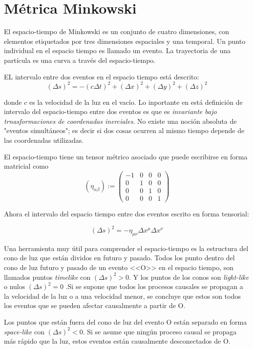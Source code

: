 
	\section{Métrica Minkowski}
	
	El espacio-tiempo de Minkowski es un conjunto de cuatro dimensiones, con elementos etiquetados por tres dimensiones espaciales y una temporal. Un punto individual en el espacio tiempo es llamado un evento. La trayectoria de una partícula es una curva a través del espacio-tiempo. 
	
	
	
	EL intervalo entre dos eventos en el espacio tiempo está descrito:
	$$(\Delta s)^2=-(c\Delta t)^2+(\Delta x)^{2}+(\Delta y)^{2}+(\Delta z)^{2}$$
	
	
	
	
	donde $c$ es la velocidad de la luz en el vacío. Lo inportante en está definición de intervalo del espacio-tiempo entre dos eventos es que es \textit{invariante bajo trnasformaciones de coordenadas inerciales}. No existe una noción absoluta de "eventos simultáneos"; es decir si dos cosas ocurren al mismo tiempo depende de las coordenadas utilizadas.

	El espacio-tiempo tiene un tensor métrico asociado que puede escribirse en forma matricial como
$${\displaystyle \left(\eta _{\alpha \beta }\right):={\begin{pmatrix}-1&0&0&0\\0&1&0&0\\0&0&1&0\\0&0&0&1\end{pmatrix}}} $$
	
Ahora el intervalo del espacio tiempo entre dos eventos escrito en forma tensorial:


	$$(\Delta s)^{2}= -\eta_{\mu \nu }\Delta x^{\mu}\Delta x^{\nu}$$
	

Una herramienta muy útil para comprender el espacio-tiempo es la estructura del cono de luz que están dividos en futuro y pasado. Todos los punto dentro del cono de luz futuro y pasado de  un evento <<O>> en el espacio tiempo, son llamados puntos \textit{timelike} con $(\Delta s)^{2} > 0 $. Y  los puntos de los conos son \textit{light-like} o nulos $ (\Delta s)^{2}=0 $ .Si se supone que todos los procesos causales se propagan a la velocidad de la luz o a una velocidad menor, se concluye que estos son todos los eventos que se pueden afectar causalmente a partir de O. 

Los puntos que  están fuera del cono de luz del evento O están separado en forma \textit{space-like} con $ (\Delta s)^{2}<0 $.  Si se asume que ningún proceso causal se propaga más rápido que la luz, estos eventos están causalmente desconectados de O. 



%


	

	
